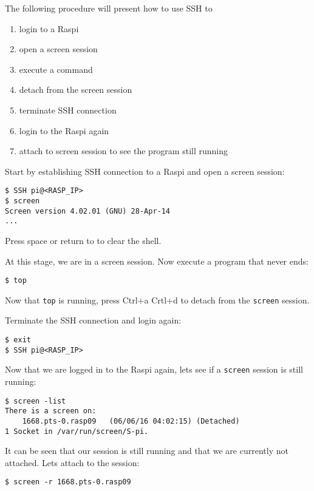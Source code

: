 The following procedure will present how to use SSH to
\begin{enumerate}
    \item login to a \ac{Raspi}
    \item open a screen session
    \item execute a command
    \item detach from the screen session
    \item terminate SSH connection
    \item login to the \ac{Raspi} again
    \item attach to screen session to see the program still running
\end{enumerate}

Start by establishing SSH connection to a \ac{Raspi} and open a screen session:
\begin{lstlisting}[]
$ SSH pi@<RASP_IP>
$ screen
Screen version 4.02.01 (GNU) 28-Apr-14
...
\end{lstlisting}
\FloatBarrier
\vspace{-5mm}
Press space or return to to clear the shell.

At this stage, we are in a screen session. Now execute a program that never ends:
\begin{lstlisting}[]
$ top
\end{lstlisting}
\FloatBarrier
\vspace{-5mm}

Now that \texttt{top} is running, press Ctrl+a Crtl+d to detach from
the \texttt{screen} session.

Terminate the SSH connection and login again:
\begin{lstlisting}[]
$ exit
$ SSH pi@<RASP_IP>
\end{lstlisting}
\FloatBarrier
\vspace{-5mm}

Now that we are logged in to the \ac{Raspi} again, lets see if a
\texttt{screen} session is still running:
\begin{lstlisting}[]
$ screen -list
There is a screen on:
	1668.pts-0.rasp09	(06/06/16 04:02:15)	(Detached)
1 Socket in /var/run/screen/S-pi.
\end{lstlisting}
\FloatBarrier
\vspace{-5mm}

It can be seen that our session is still running and that we are
currently not attached. Lets attach to the session:
\begin{lstlisting}[]
$ screen -r 1668.pts-0.rasp09
\end{lstlisting}
\FloatBarrier
\vspace{-5mm}

